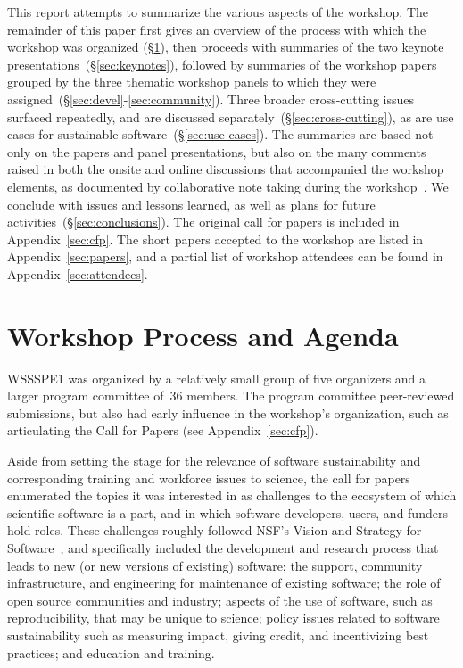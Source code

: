 \documentclass[11pt, oneside]{amsart}
\begin{document}
This report attempts to summarize the various aspects of the workshop.
The remainder of this paper first gives an overview of the process
with which the workshop was organized (\S\ref{sec:process}), then
proceeds with summaries of the two keynote
presentations~(\S\ref{sec:keynotes}), followed by summaries of the
workshop papers grouped by the three thematic workshop panels to which
they were assigned~(\S\ref{sec:devel}-\ref{sec:community}). Three
broader cross-cutting issues surfaced repeatedly, and are discussed
separately~(\S\ref{sec:cross-cutting}), as are use cases for
sustainable software~(\S\ref{sec:use-cases}). The summaries are based
not only on the papers and panel presentations, but also on the many
comments raised in both the onsite and online discussions that
accompanied the workshop elements, as documented by collaborative note
taking during the workshop~\cite{WSSSPE1-google-notes}. We conclude
with issues and lessons learned, as well as plans for future
activities~(\S\ref{sec:conclusions}).  The original call for papers is included in 
Appendix~\ref{sec:cfp}.  The short papers accepted to
the workshop are listed in Appendix~\ref{sec:papers}, and a partial
list of workshop attendees can be found in
Appendix~\ref{sec:attendees}. 

\section{Workshop Process and Agenda} \label{sec:process}

WSSSPE1 was organized by a relatively small group of five organizers
and a larger program committee of~36 members. The program committee
peer-reviewed submissions, but also had early influence in the
workshop's organization, such as articulating the Call for Papers (see
Appendix~\ref{sec:cfp}).

Aside from setting the stage for the relevance of software
sustainability and corresponding training and workforce issues to
science, the call for papers enumerated the topics it was interested
in as challenges to the ecosystem of which scientific software is a
part, and in which software developers, users, and funders hold
roles. These challenges roughly followed NSF's Vision and Strategy for
Software~\cite{NSF_software_vision}, and specifically included the
development and research process that leads to new (or new versions of
existing) software; the support, community infrastructure, and
engineering for maintenance of existing software; the role of open
source communities and industry; aspects of the use of software, such
as reproducibility, that may be unique to science; policy issues
related to software sustainability such as measuring impact, giving
credit, and incentivizing best practices; and education and training.
\end{document}
